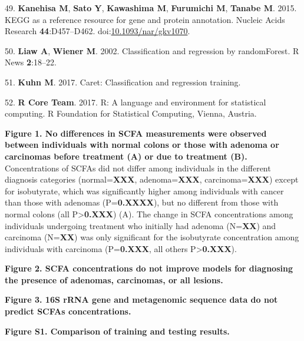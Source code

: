 \documentclass[11pt,]{article}
\begin{document}
\leavevmode\hypertarget{ref-Kanehisa2015}{}%
49. \textbf{Kanehisa M}, \textbf{Sato Y}, \textbf{Kawashima M},
\textbf{Furumichi M}, \textbf{Tanabe M}. 2015. KEGG as a reference
resource for gene and protein annotation. Nucleic Acids Research
\textbf{44}:D457--D462.
doi:\href{https://doi.org/10.1093/nar/gkv1070}{10.1093/nar/gkv1070}.

\leavevmode\hypertarget{ref-Liaw2002}{}%
50. \textbf{Liaw A}, \textbf{Wiener M}. 2002. Classification and
regression by randomForest. R News \textbf{2}:18--22.

\leavevmode\hypertarget{ref-Kuhn2017}{}%
51. \textbf{Kuhn M}. 2017. Caret: Classification and regression
training.

\leavevmode\hypertarget{ref-r_citation_2017}{}%
52. \textbf{R Core Team}. 2017. R: A language and environment for
statistical computing. R Foundation for Statistical Computing, Vienna,
Austria.

\newpage

\textbf{Figure 1. No differences in SCFA measurements were observed
between individuals with normal colons or those with adenoma or
carcinomas before treatment (A) or due to treatment (B).} Concentrations
of SCFAs did not differ among individuals in the different diagnosis
categories (normal=\textbf{XXX}, adenoma=\textbf{XXX},
carcinoma=\textbf{XXX}) except for isobutyrate, which was significantly
higher among individuals with cancer than those with adenomas
(P=\textbf{0.XXXX}), but no different from those with normal colons (all
P\textgreater{}\textbf{0.XXX}) (A). The change in SCFA concentrations
among individuals undergoing treatment who initially had adenoma
(N=\textbf{XX}) and carcinoma (N=\textbf{XX}) was only significant for
the isobutyrate concentration among individuals with carcinoma
(P=\textbf{0.XXX}, all others P\textgreater{}\textbf{0.XXX}).

\textbf{Figure 2. SCFA concentrations do not improve models for
diagnosing the presence of adenomas, carcinomas, or all lesions.}

\textbf{Figure 3. 16S rRNA gene and metagenomic sequence data do not
predict SCFAs concentrations.}

\textbf{Figure S1. Comparison of training and testing results.}
\end{document}
